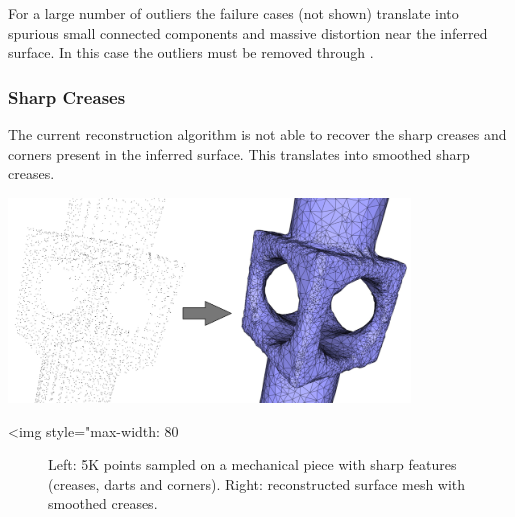 For a large number of outliers the failure cases (not shown) translate into spurious small connected components and massive distortion near the inferred surface. In this case the outliers must be removed through .


\subsubsection{Sharp Creases}

The current reconstruction algorithm is not able to recover the sharp creases and corners present in the inferred surface. This translates into smoothed sharp creases.

\begin{center}
    \begin{ccTexOnly}
        \includegraphics[width=0.8\textwidth]{Surface_reconstruction_points_3/sharp_features}
    \end{ccTexOnly}
    \begin{ccHtmlOnly}
        <img style="max-width: 80%
    \end{ccHtmlOnly}
    \begin{figure}[h]
        \caption{Left: 5K points sampled on a mechanical piece with
                 sharp features (creases, darts and corners).
                 Right: reconstructed surface mesh with smoothed
                 creases.}
        \label{Surface_reconstruction_points_3-fig-sharp_features}
    \end{figure}
\end{center}

